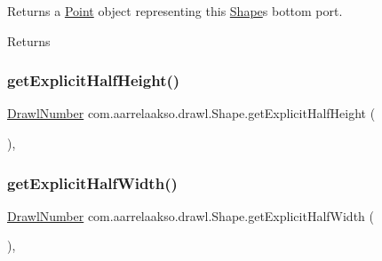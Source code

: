 Returns a \hyperlink{classcom_1_1aarrelaakso_1_1drawl_1_1_point}{Point} object representing this \hyperlink{classcom_1_1aarrelaakso_1_1drawl_1_1_shape}{Shape}\textquotesingle{}s bottom port. 

\begin{DoxyReturn}{Returns}

\end{DoxyReturn}
\mbox{\label{classcom_1_1aarrelaakso_1_1drawl_1_1_shape_a7207aa8ba07ed18af81fb9d92a979cd6}} 
\subsubsection{\texorpdfstring{get\+Explicit\+Half\+Height()}{getExplicitHalfHeight()}}
{\footnotesize\ttfamily \hyperlink{classcom_1_1aarrelaakso_1_1drawl_1_1_drawl_number}{Drawl\+Number} com.\+aarrelaakso.\+drawl.\+Shape.\+get\+Explicit\+Half\+Height (\begin{DoxyParamCaption}{ }\end{DoxyParamCaption})\hspace{0.3cm}{\ttfamily [protected]}, {\ttfamily [inherited]}}

\mbox{\label{classcom_1_1aarrelaakso_1_1drawl_1_1_shape_af952f32cb1706da71c9cb75916f4d665}} 
\subsubsection{\texorpdfstring{get\+Explicit\+Half\+Width()}{getExplicitHalfWidth()}}
{\footnotesize\ttfamily \hyperlink{classcom_1_1aarrelaakso_1_1drawl_1_1_drawl_number}{Drawl\+Number} com.\+aarrelaakso.\+drawl.\+Shape.\+get\+Explicit\+Half\+Width (\begin{DoxyParamCaption}{ }\end{DoxyParamCaption})\hspace{0.3cm}{\ttfamily [protected]}, {\ttfamily [inherited]}}


